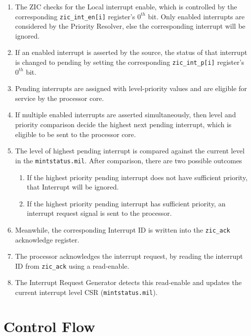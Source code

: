 \begin{enumerate}
    \item The ZIC checks for the Local interrupt enable, which is controlled by the corresponding \texttt{zic\_int\_en[i]} register’s $0^{th}$ bit. Only enabled interrupts are considered by the Priority Resolver, else the corresponding interrupt will be ignored.
    \item If an enabled interrupt is asserted by the source, the status of that interrupt is changed to pending by setting the corresponding \texttt{zic\_int\_p[i]} register’s $0^{th}$ bit.
    \item Pending interrupts are assigned with level-priority values and are eligible for service by the processor core.
    \item If multiple enabled interrupts are asserted simultaneously, then level and priority comparison decide the highest next pending interrupt, which is eligible to be sent to the processor core.
    \item The level of highest pending interrupt is compared against the current level in the \texttt{mintstatus.mil}. After comparison, there are two possible outcomes
    \begin{enumerate}[label=(\alph*)]
        \item If the highest priority pending interrupt does not have sufficient priority, that Interrupt will be ignored.
        \item If the highest priority pending interrupt has sufficient priority, an interrupt request signal is sent to the processor.
    \end{enumerate}
    \item Meanwhile, the corresponding Interrupt ID is written into the \texttt{zic\_ack} acknowledge register.
    \item The processor acknowledges the interrupt request, by reading the interrupt ID from \texttt{zic\_ack} using a read-enable.
    \item The Interrupt Request Generator detects this read-enable and updates the current interrupt level CSR (\texttt{mintstatus.mil}).
\end{enumerate}

\section{Control Flow}
\label{sec:control-flow}

